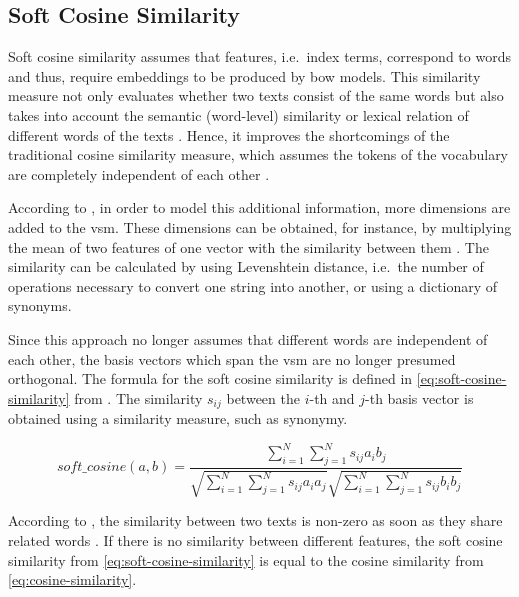 
\subsection{Soft Cosine Similarity}\label{subsec:soft-cosine-similarity}

Soft cosine similarity assumes that features, i.e.\ index terms, correspond to words and thus, 
require embeddings to be produced by \ac{bow} models. 
This similarity measure not only evaluates whether two texts consist of the same words but 
also takes into account the semantic (word-level) similarity or lexical relation of different words of the texts \cite{soft_cosine2017}.
Hence, it improves the shortcomings of the traditional cosine similarity measure, 
which assumes the tokens of the vocabulary are completely independent of each other \cite{soft_cosine2014}.

According to \citeauthor{soft_cosine2014}, in order to model this additional information, more dimensions are added to the \ac{vsm}.
These dimensions can be obtained, for instance, by multiplying the mean of two features of one vector with the similarity between them \cite{soft_cosine2014}.
The similarity can be calculated by using Levenshtein distance, i.e.\ the number of operations necessary to convert one string into another, 
or using a dictionary of synonyms.

Since this approach no longer assumes that different words are independent of each other, 
the basis vectors which span the \ac{vsm} are no longer presumed orthogonal.
The formula for the soft cosine similarity is defined in \autoref{eq:soft-cosine-similarity} from \cite{soft_cosine2014}.
The similarity $s_{ij}$ between the $i$-th and $j$-th basis vector is obtained using a similarity measure, such as synonymy.

\begin{equation}
    soft\_cosine(a,b) = \frac{\sum_{i=1}^{N}\sum_{j=1}^{N}s_{ij}a_{i}b_{j}}{\sqrt{\sum_{i=1}^{N}\sum_{j=1}^{N}s_{ij}a_{i}a_{j}}\sqrt{\sum_{i=1}^{N}\sum_{j=1}^{N}s_{ij}b_{i}b_{j}}}
    \label{eq:soft-cosine-similarity}
\end{equation}

According to \citeauthor{soft_cosine2017}, the similarity between two texts is non-zero as soon as they share related words \cite{soft_cosine2017}.
If there is no similarity between different features, 
the soft cosine similarity from \autoref{eq:soft-cosine-similarity} is equal to the cosine similarity from \autoref{eq:cosine-similarity}.
